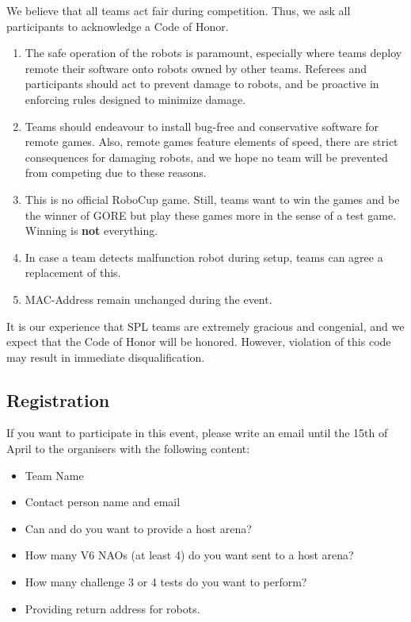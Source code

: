 We believe that all teams act fair during competition. Thus, we ask all participants to acknowledge a Code of Honor.
\begin{enumerate}
    \item The safe operation of the robots is paramount, especially where teams deploy remote their software onto robots owned by other teams. Referees and participants should act to prevent damage to robots, and be proactive in enforcing rules  designed to minimize damage.
    \item Teams should endeavour to install bug-free and conservative software for remote games. Also, remote games feature elements of speed, there are strict consequences for damaging robots, and we hope no team will be prevented from competing due to these reasons.
    \item This is no official RoboCup game. Still, teams want to win the games and be the winner of GORE but play these games more in the sense of a test game. Winning is \textbf{not} everything.
    \item In case a team detects malfunction robot during setup, teams can agree a replacement of this.
    \item MAC-Address remain unchanged during the event.
\end{enumerate} 

It is our experience that SPL teams are extremely gracious and congenial, and we expect that the Code of Honor will be honored. However, violation of this code may result in immediate disqualification.

\subsection{Registration}

If you want to participate in this event, please write an email until the 15th of April to the organisers with the following content:
\begin{itemize}
    \item Team Name
    \item Contact person name and email
    \item Can and do you want to provide a host arena?
    \item How many V6 NAOs (at least 4) do you want sent to a host arena?
    \item How many challenge 3 or 4 tests do you want to perform?
    \item Providing return address for robots.
\end{itemize}

